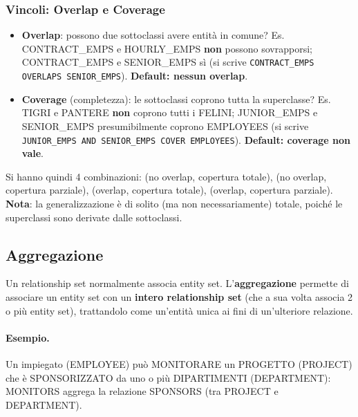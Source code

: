 \documentclass[12pt, a4paper]{article}
\begin{document}
\subsubsection{Vincoli: Overlap e Coverage}
\begin{itemize}
    \item \textbf{Overlap}: possono due sottoclassi avere entità in comune? Es. CONTRACT\_EMPS e HOURLY\_EMPS \textbf{non} possono sovrapporsi; CONTRACT\_EMPS e SENIOR\_EMPS sì (si scrive \texttt{CONTRACT\_EMPS OVERLAPS SENIOR\_EMPS}). \textbf{Default: nessun overlap}.
    \item \textbf{Coverage} (completezza): le sottoclassi coprono tutta la superclasse? Es. TIGRI e PANTERE \textbf{non} coprono tutti i FELINI; JUNIOR\_EMPS e SENIOR\_EMPS presumibilmente coprono EMPLOYEES (si scrive \texttt{JUNIOR\_EMPS AND SENIOR\_EMPS COVER EMPLOYEES}). \textbf{Default: coverage non vale}.
\end{itemize}
Si hanno quindi 4 combinazioni: (no overlap, copertura totale), (no overlap, copertura parziale), (overlap, copertura totale), (overlap, copertura parziale). \textbf{Nota}: la generalizzazione è di solito (ma non necessariamente) totale, poiché le superclassi sono derivate dalle sottoclassi.

\subsection{Aggregazione}
Un relationship set normalmente associa entity set. L'\textbf{aggregazione} permette di associare un entity set con un \textbf{intero relationship set} (che a sua volta associa 2 o più entity set), trattandolo come un'entità unica ai fini di un'ulteriore relazione.

\paragraph{Esempio.} Un impiegato (EMPLOYEE) può MONITORARE un PROGETTO (PROJECT) che è SPONSORIZZATO da uno o più DIPARTIMENTI (DEPARTMENT): MONITORS aggrega la relazione SPONSORS (tra PROJECT e DEPARTMENT).
\end{document}

